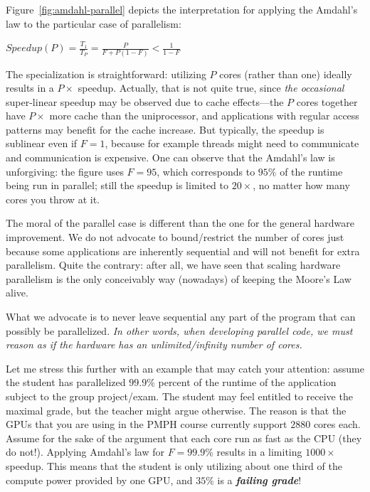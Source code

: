 \documentclass[acmsmall,review]{acmart}\settopmatter{printfolios=true,printccs=false,printacmref=false}
\begin{document}
Figure~\ref{fig:amdahl-parallel} depicts the interpretation for
applying the Amdahl's law to the particular case of parallelism:
\begin{center}
$Speedup(P) = \frac{T_1}{T_P} = \frac{P}{F+P(1-F)}<\frac{1}{1-F}$
\end{center}
The specialization is straightforward: utilizing $P$ cores (rather 
than one) ideally results in a $P\times$ speedup. Actually, that 
is not quite true, since \emph{the occasional} super-linear speedup 
may be observed due to cache effects---the $P$ cores together have 
$P\times$ more cache than the uniprocessor, and applications 
with regular access patterns may benefit for the cache increase.
But typically, the speedup is sublinear even if $F=1$, because
for example threads might need to communicate and communication 
is expensive. One can observe that the Amdahl's law is unforgiving:
the figure uses $F=95$, which corresponds to $95\%$ of the runtime
being run in parallel; still the speedup is limited to $20\times$,
no matter how many cores you throw at it.

The moral of the parallel case is different than the one for the
general hardware improvement. We do not advocate to bound/restrict 
the number of cores just because some applications are inherently
sequential and will not benefit for extra parallelism. Quite the
contrary: after all, we have seen that scaling hardware parallelism
is the only conceivably way (nowadays) of keeping the Moore's Law
alive. 

What we advocate is to never leave sequential any part of 
the program that can possibly be parallelized. \emph{In other words, 
when developing parallel code, we must reason as if the hardware 
has an unlimited/infinity number of cores.}

Let me stress this further with an example that may catch your attention: 
assume the student has parallelized $99.9\%$ percent of the runtime of 
the application subject to the group project/exam. The student may feel 
entitled to receive the maximal grade, but the teacher might argue 
otherwise. The reason is that the GPUs that you are using in the PMPH 
course currently support $2880$ cores each.   Assume for the sake of 
the argument that each core run as fast as the CPU (they do not!). 
Applying Amdahl's law for $F=99.9\%$ results in a limiting
$1000\times$ speedup. This means that the student is only utilizing
about one third of the compute power provided by one GPU, and $35\%$
is a \emph{\bf failing grade}!\\
$\mbox{ }$\\
\end{document}
